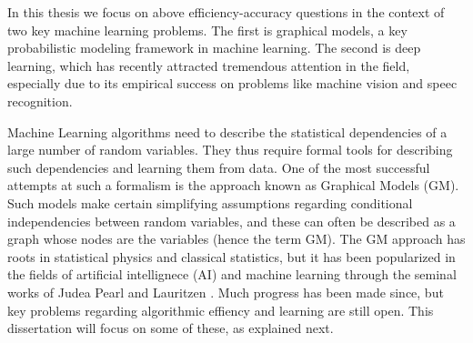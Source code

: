 In this thesis we focus on above efficiency-accuracy questions in the context of two key machine learning problems. The first is graphical models, a key probabilistic modeling framework in machine learning. The second is deep learning, which has recently attracted tremendous attention in the field, especially due to its empirical success on problems like machine vision and speec recognition.


Machine Learning algorithms need to describe the statistical dependencies of a large number of random variables. They thus require formal tools for describing
such dependencies and learning them from data. One of the most successful attempts at such a formalism is the approach known as Graphical Models (GM). Such models make certain simplifying assumptions regarding conditional independencies between random variables, and these can often be described as a graph whose nodes are the variables (hence the term GM). The GM approach has roots in statistical physics and classical statistics, but it has been popularized in the fields of artificial intellignece (AI) and machine learning through the seminal works of Judea Pearl and Lauritzen . Much progress has been made since, but key
problems regarding algorithmic effiency and learning are still open. This dissertation will focus on some of these, as explained next.      



